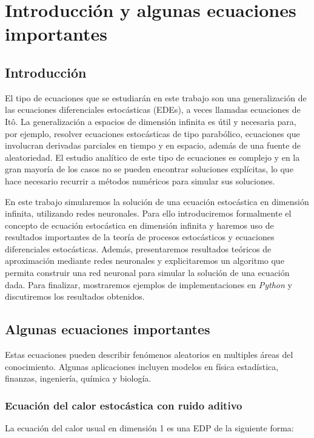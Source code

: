 \section{Introducción y algunas ecuaciones importantes}

\subsection{Introducción}
El tipo de ecuaciones que se estudiarán en este trabajo son una generalización de las ecuaciones diferenciales estocásticas (EDEs), a veces llamadas ecuaciones de Itô. La generalización a espacios de dimensión infinita es útil y necesaria para, por ejemplo, resolver ecuaciones estocásticas de tipo parabólico, ecuaciones que involucran derivadas parciales en tiempo y en espacio, además de una fuente de aleatoriedad. El estudio analítico de este tipo de ecuaciones es complejo y en la gran mayoría de los casos no se pueden encontrar soluciones explícitas, lo que hace necesario recurrir a métodos numéricos para simular sus soluciones.

En este trabajo simularemos la solución de una ecuación estocástica en dimensión infinita, utilizando redes neuronales. Para ello introduciremos formalmente el concepto de ecuación estocástica en dimensión infinita y haremos uso de resultados importantes de la teoría de procesos estocásticos y ecuaciones diferenciales estocásticas. Además, presentaremos resultados teóricos de aproximación mediante redes neuronales y explicitaremos un algoritmo que permita construir una red neuronal para simular la solución de una ecuación dada. Para finalizar, mostraremos ejemplos de implementaciones en \textit{Python} y discutiremos los resultados obtenidos.

\subsection{Algunas ecuaciones importantes}

Estas ecuaciones pueden describir fenómenos aleatorios en multiples áreas del conocimiento. Algunas aplicaciones incluyen modelos en física estadística, finanzas, ingeniería, química y biología.

\subsubsection{Ecuación del calor estocástica con ruido aditivo}

La ecuación del calor usual en dimensión 1 es una EDP de la siguiente forma:

